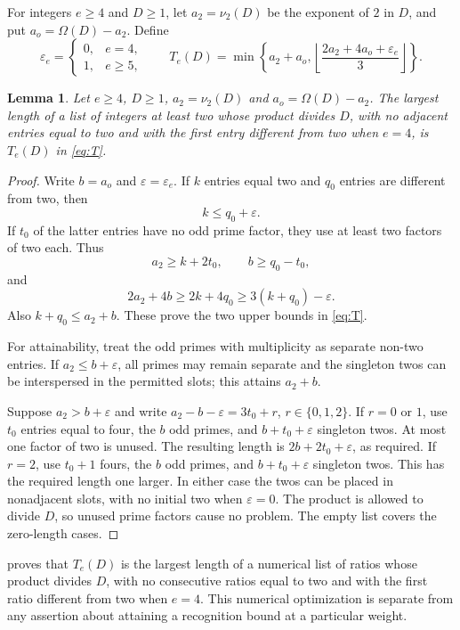 \documentclass[11pt,a4paper]{amsart}
\numberwithin{equation}{section}
\theoremstyle{plain}
\newtheorem{lemma}[theorem]{Lemma}
\theoremstyle{definition}
\begin{document}
For integers \(e\ge4\) and \(D\ge1\), let \(a_2=\nu_2(D)\) be the
exponent of \(2\) in \(D\), and put \(a_o=\Omega(D)-a_2\).  Define
\begin{equation}\label{eq:T}
\varepsilon_e=\begin{cases}0,&e=4,\\1,&e\ge5,\end{cases}
\qquad
T_e(D)=\min\left\{a_2+a_o,
\left\lfloor\frac{2a_2+4a_o+\varepsilon_e}{3}\right\rfloor\right\}.
\end{equation}
\begin{lemma}\label{lem:arithmetic-optimization}
Let \(e\ge4\), \(D\ge1\), \(a_2=\nu_2(D)\) and \(a_o=\Omega(D)-a_2\).
The largest length of a list of integers at least two whose product
divides \(D\), with no adjacent entries equal to two and with the first
entry different from two when \(e=4\), is \(T_e(D)\) in \eqref{eq:T}.
\end{lemma}
\begin{proof}
Write \(b=a_o\) and \(\varepsilon=\varepsilon_e\).
If \(k\) entries equal two and \(q_0\) entries are different from two, then
\[
k\le q_0+\varepsilon.
\]
If \(t_0\) of the latter entries have no odd prime factor, they use at least
two factors of two each.  Thus
\[
a_2\ge k+2t_0,\qquad b\ge q_0-t_0,
\]
and
\[
2a_2+4b\ge2k+4q_0\ge3(k+q_0)-\varepsilon.
\]
Also \(k+q_0\le a_2+b\).  These prove the two upper bounds in \eqref{eq:T}.

For attainability, treat the odd primes with multiplicity as separate
non-two entries.  If \(a_2\le b+\varepsilon\), all primes may remain separate
and the singleton twos can be interspersed in the permitted slots; this
attains \(a_2+b\).

Suppose \(a_2>b+\varepsilon\) and write
\(a_2-b-\varepsilon=3t_0+r\), \(r\in\{0,1,2\}\).
If \(r=0\) or \(1\), use \(t_0\) entries equal to four, the \(b\) odd primes,
and \(b+t_0+\varepsilon\) singleton twos.  At most one factor of two is
unused.  The resulting length is \(2b+2t_0+\varepsilon\), as required.
If \(r=2\), use \(t_0+1\) fours, the \(b\) odd primes, and
\(b+t_0+\varepsilon\) singleton twos.  This has the required length one
larger.  In either case the twos can be placed in nonadjacent slots,
with no initial two when \(\varepsilon=0\).
The product is allowed to divide \(D\), so unused prime factors cause no
problem.  The empty list covers the zero-length cases.
\end{proof}

 proves that \(T_e(D)\) is the largest
length of a numerical list of ratios whose product divides \(D\), with no
consecutive ratios equal to two and with the first ratio different from
two when \(e=4\).  This numerical optimization is separate from any assertion
about attaining a recognition bound at a particular weight.
\end{document}
